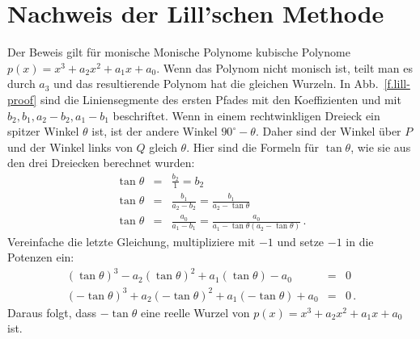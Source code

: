 \section{Nachweis der Lill'schen Methode}\label{s.proof}


Der Beweis gilt für monische {Monische Polynome} kubische Polynome $p(x)=x^3+a_2x^2+a_1x+a_0$. Wenn das Polynom nicht monisch ist, teilt man es durch $a_3$ und das resultierende Polynom hat die gleichen Wurzeln. In Abb.~\ref{f.lill-proof} sind die Liniensegmente des ersten Pfades mit den Koeffizienten und mit $b_2,b_1,a_2-b_2,a_1-b_1$ beschriftet. Wenn in einem rechtwinkligen Dreieck ein spitzer Winkel $\theta$ ist, ist der andere Winkel $90^\circ-\theta$. Daher sind der Winkel über $P$ und der Winkel links von $Q$ gleich $\theta$. Hier sind die Formeln für $\tan \theta$, wie sie aus den drei Dreiecken berechnet wurden:
\begin{eqnarray*}
\tan \theta &=& \frac{b_2}{1}=b_2\\
\tan \theta &=& \frac{b_1}{a_2-b_2}=\frac{b_1}{a_2-\tan\theta}\\
\tan \theta &=& \frac{a_0}{a_1-b_1}=\frac{a_0}{a_1-\tan\theta(a_2-\tan\theta)}\,.
\end{eqnarray*}
Vereinfache die letzte Gleichung, multipliziere mit $-1$ und setze $-1$ in die Potenzen ein:
\begin{eqnarray*}
(\tan\theta)^3-a_2(\tan\theta)^2+a_1(\tan\theta)-a_0&=&0\\
(-\tan\theta)^3+a_2(-\tan\theta)^2+a_1(-\tan\theta)+a_0&=&0\,.
\end{eqnarray*}
Daraus folgt, dass $-\tan\theta$ eine reelle Wurzel von $p(x)=x^3+a_2x^2+a_1x+a_0$ ist.


